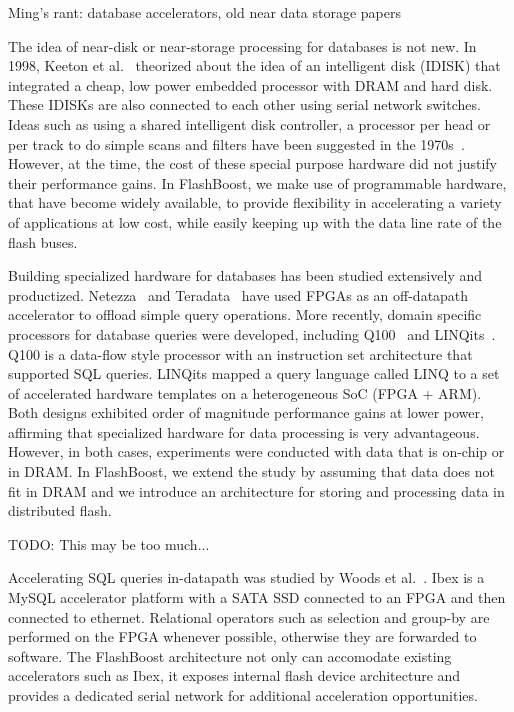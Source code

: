 Ming's rant: database accelerators, old near data storage papers

The idea of near-disk or near-storage processing for databases is not new. In
1998, Keeton et al.~\cite{?} theorized about the idea of an intelligent disk
(IDISK) that integrated a cheap, low power embedded processor with DRAM and
hard disk.  These IDISKs are also connected to each other using serial network
switches.  Ideas such as using a shared intelligent disk controller, a
processor per head or per track to do simple scans and filters have been
suggested in the 1970s~\cite{?,?,?}.  However, at the time, the cost of these
special purpose hardware did not justify their performance gains. In
FlashBoost, we make use of programmable hardware, that have become widely
available, to provide flexibility in accelerating a variety of applications at
low cost, while easily keeping up with the data line rate of the flash buses. 

Building specialized hardware for databases has been studied extensively and
productized. Netezza~\cite{?} and Teradata~\cite{?} have used FPGAs as an
off-datapath accelerator to offload simple query operations. More recently,
domain specific processors for database queries were developed, including
Q100~\cite{?} and LINQits~\cite{?}. Q100 is a data-flow style processor with an
instruction set architecture that supported SQL queries. LINQits mapped a query
language called LINQ to a set of accelerated hardware templates on a
heterogeneous SoC (FPGA + ARM). Both designs exhibited order of magnitude
performance gains at lower power, affirming that specialized hardware for data
processing is very advantageous. However, in both cases, experiments were
conducted with data that is on-chip or in DRAM. In FlashBoost, we extend the
study by assuming that data does not fit in DRAM and we introduce an
architecture for storing and processing data in distributed flash. 

TODO: This may be too much... 

Accelerating SQL queries in-datapath was studied by Woods et al.~\cite{?}.
Ibex is a MySQL accelerator platform with a SATA SSD connected to an FPGA and
then connected to ethernet. Relational operators such as selection and group-by
are performed on the FPGA whenever possible, otherwise they are forwarded to
software. The FlashBoost architecture not only can accomodate existing
accelerators such as Ibex, it exposes internal flash device architecture and
provides a dedicated serial network for additional acceleration opportunities. 





